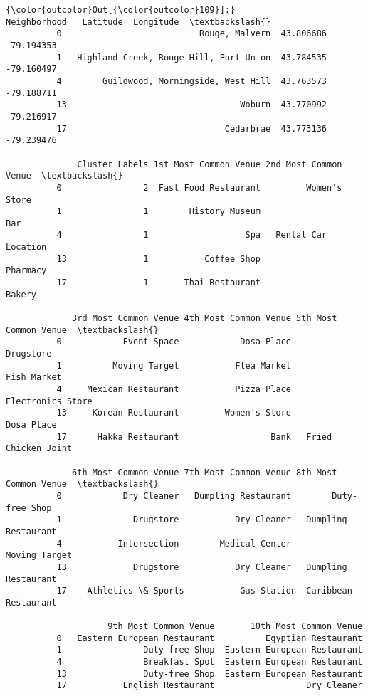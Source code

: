 \documentclass[11pt]{article}
\begin{document}
\begin{Verbatim}[commandchars=\\\{\}]
{\color{outcolor}Out[{\color{outcolor}109}]:}                               Neighborhood   Latitude  Longitude  \textbackslash{}
          0                           Rouge, Malvern  43.806686 -79.194353   
          1   Highland Creek, Rouge Hill, Port Union  43.784535 -79.160497   
          4        Guildwood, Morningside, West Hill  43.763573 -79.188711   
          13                                  Woburn  43.770992 -79.216917   
          17                               Cedarbrae  43.773136 -79.239476   
          
              Cluster Labels 1st Most Common Venue 2nd Most Common Venue  \textbackslash{}
          0                2  Fast Food Restaurant         Women's Store   
          1                1        History Museum                   Bar   
          4                1                   Spa   Rental Car Location   
          13               1           Coffee Shop              Pharmacy   
          17               1       Thai Restaurant                Bakery   
          
             3rd Most Common Venue 4th Most Common Venue 5th Most Common Venue  \textbackslash{}
          0            Event Space            Dosa Place             Drugstore   
          1          Moving Target           Flea Market           Fish Market   
          4     Mexican Restaurant           Pizza Place     Electronics Store   
          13     Korean Restaurant         Women's Store            Dosa Place   
          17      Hakka Restaurant                  Bank   Fried Chicken Joint   
          
             6th Most Common Venue 7th Most Common Venue 8th Most Common Venue  \textbackslash{}
          0            Dry Cleaner   Dumpling Restaurant        Duty-free Shop   
          1              Drugstore           Dry Cleaner   Dumpling Restaurant   
          4           Intersection        Medical Center         Moving Target   
          13             Drugstore           Dry Cleaner   Dumpling Restaurant   
          17    Athletics \& Sports           Gas Station  Caribbean Restaurant   
          
                    9th Most Common Venue       10th Most Common Venue  
          0   Eastern European Restaurant          Egyptian Restaurant  
          1                Duty-free Shop  Eastern European Restaurant  
          4                Breakfast Spot  Eastern European Restaurant  
          13               Duty-free Shop  Eastern European Restaurant  
          17           English Restaurant                  Dry Cleaner  
\end{Verbatim}
            
\end{document}
